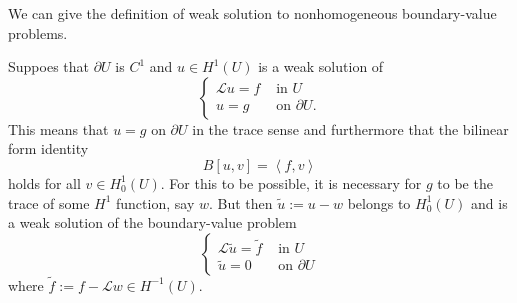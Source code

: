 We can give the definition of weak solution to nonhomogeneous boundary-value problems.
\begin{definition}
    Suppoes that $\partial U$ is $C^1$ and $u \in H^1(U)$ is a weak solution of
    \begin{equation*}
        \left\{\begin{aligned}
            \mathcal{L}u=f & \text { in } U            \\
            u=g            & \text { on } \partial U .
        \end{aligned}\right.
    \end{equation*}
    This means that $u=g$ on $\partial U$ in the trace sense and furthermore that the bilinear form identity
    \begin{equation*}
        B[u , v ]
        =
        \left\langle f,v \right\rangle
    \end{equation*}
    holds for all $v \in H_0^1(U)$.
    For this to be possible, it is necessary for $g$ to be the trace of some $H^1$ function, say $w$. But then $\tilde{u}:=u-w$ belongs to $H_0^1(U)$ and is a weak solution of the boundary-value problem
    \begin{equation*}
        \left\{
        \begin{aligned}
            \mathcal{L} \tilde{u}=\tilde{f} & \text { in } U          \\
            \tilde{u}=0                     & \text { on } \partial U
        \end{aligned}
        \right.
    \end{equation*}
    where $\tilde{f}:=f-\mathcal{L} w \in H^{-1}(U)$.
\end{definition}



